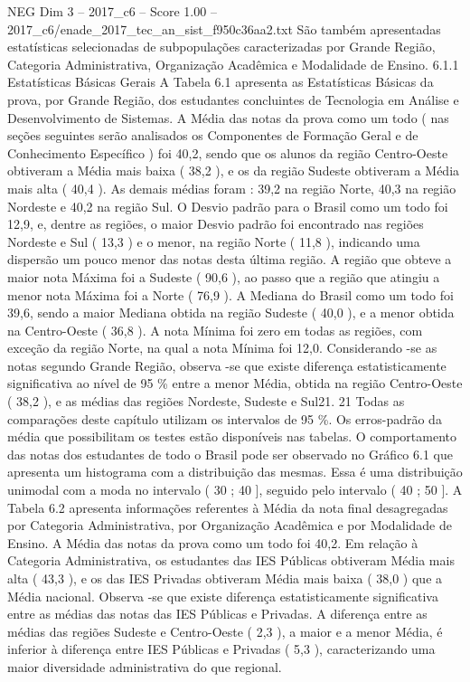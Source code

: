 \begin{textsample}{NEG Dim 3 – 2017\_c6 – Score 1.00 – 2017\_c6/enade\_2017\_tec\_an\_sist\_f950c36aa2.txt}
São também apresentadas estatísticas selecionadas de subpopulações caracterizadas por Grande Região, Categoria Administrativa, Organização Acadêmica e Modalidade de Ensino. 6.1.1 Estatísticas Básicas Gerais A Tabela 6.1 apresenta as Estatísticas Básicas da prova, por Grande Região, dos estudantes concluintes de Tecnologia em Análise e Desenvolvimento de Sistemas.
A Média das notas da prova como um todo ( nas seções seguintes serão analisados os Componentes de Formação Geral e de Conhecimento Específico ) foi 40,2, sendo que os alunos da região Centro-Oeste obtiveram a Média mais baixa ( 38,2 ), e os da região Sudeste obtiveram a Média mais alta ( 40,4 ).
As demais médias foram : 39,2 na região Norte, 40,3 na região Nordeste e 40,2 na região Sul.
O Desvio padrão para o Brasil como um todo foi 12,9, e, dentre as regiões, o maior Desvio padrão foi encontrado nas regiões Nordeste e Sul ( 13,3 ) e o menor, na região Norte ( 11,8 ), indicando uma dispersão um pouco menor das notas desta última região.
A região que obteve a maior nota Máxima foi a Sudeste ( 90,6 ), ao passo que a região que atingiu a menor nota Máxima foi a Norte ( 76,9 ).
A Mediana do Brasil como um todo foi 39,6, sendo a maior Mediana obtida na região Sudeste ( 40,0 ), e a menor obtida na Centro-Oeste ( 36,8 ).
A nota Mínima foi zero em todas as regiões, com exceção da região Norte, na qual a nota Mínima foi 12,0.
Considerando -se as notas segundo Grande Região, observa -se que existe diferença estatisticamente significativa ao nível de 95 \% entre a menor Média, obtida na região Centro-Oeste ( 38,2 ), e as médias das regiões Nordeste, Sudeste e Sul21. 21 Todas as comparações deste capítulo utilizam os intervalos de 95 \%.
Os erros-padrão da média que possibilitam os testes estão disponíveis nas tabelas.
O comportamento das notas dos estudantes de todo o Brasil pode ser observado no Gráfico 6.1 que apresenta um histograma com a distribuição das mesmas.
Essa é uma distribuição unimodal com a moda no intervalo ( 30 ; 40 ], seguido pelo intervalo ( 40 ; 50 ].
A Tabela 6.2 apresenta informações referentes à Média da nota final desagregadas por Categoria Administrativa, por Organização Acadêmica e por Modalidade de Ensino.
A Média das notas da prova como um todo foi 40,2.
Em relação à Categoria Administrativa, os estudantes das IES Públicas obtiveram Média mais alta ( 43,3 ), e os das IES Privadas obtiveram Média mais baixa ( 38,0 ) que a Média nacional.
Observa -se que existe diferença estatisticamente significativa entre as médias das notas das IES Públicas e Privadas.
A diferença entre as médias das regiões Sudeste e Centro-Oeste ( 2,3 ), a maior e a menor Média, é inferior à diferença entre IES Públicas e Privadas ( 5,3 ), caracterizando uma maior diversidade administrativa do que regional.

\end{textsample}
